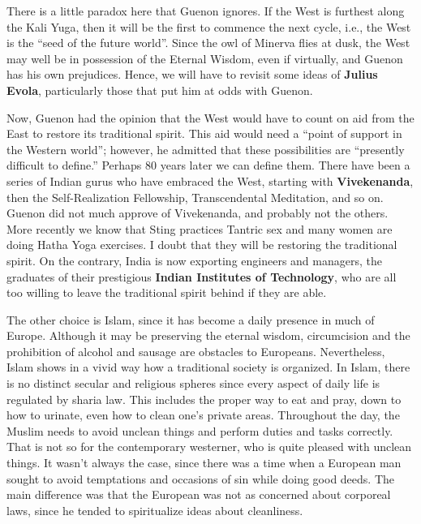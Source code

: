There is a little paradox here that Guenon ignores. If the West is furthest along the Kali Yuga, then it will be the first to commence the next cycle, i.e., the West is the ``seed of the future world''. Since the owl of Minerva flies at dusk, the West may well be in possession of the Eternal Wisdom, even if virtually, and Guenon has his own prejudices. Hence, we will have to revisit some ideas of \textbf{Julius Evola}, particularly those that put him at odds with Guenon.

Now, Guenon had the opinion that the West would have to count on aid from the East to restore its traditional spirit. This aid would need a ``point of support in the Western world''; however, he admitted that these possibilities are ``presently difficult to define.'' Perhaps 80 years later we can define them. There have been a series of Indian gurus who have embraced the West, starting with \textbf{Vivekenanda}, then the Self-Realization Fellowship, Transcendental Meditation, and so on. Guenon did not much approve of Vivekenanda, and probably not the others. More recently we know that Sting practices Tantric sex and many women are doing Hatha Yoga exercises. I doubt that they will be restoring the traditional spirit. On the contrary, India is now exporting engineers and managers, the graduates of their prestigious \textbf{Indian Institutes of Technology}, who are all too willing to leave the traditional spirit behind if they are able.

The other choice is Islam, since it has become a daily presence in much of Europe. Although it may be preserving the eternal wisdom, circumcision and the prohibition of alcohol and sausage are obstacles to Europeans. Nevertheless, Islam shows in a vivid way how a traditional society is organized. In Islam, there is no distinct secular and religious spheres since every aspect of daily life is regulated by sharia law. This includes the proper way to eat and pray, down to how to urinate, even how to clean one's private areas. Throughout the day, the Muslim needs to avoid unclean things and perform duties and tasks correctly. That is not so for the contemporary westerner, who is quite pleased with unclean things. It wasn't always the case, since there was a time when a European man sought to avoid temptations and occasions of sin while doing good deeds. The main difference was that the European was not as concerned about corporeal laws, since he tended to spiritualize ideas about cleanliness.

